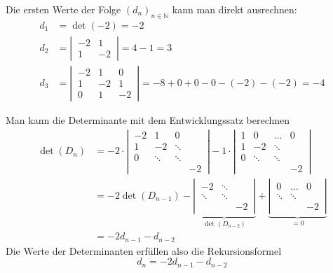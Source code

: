 \begin{loesung}
\begin{teilaufgaben}
\item
Die ersten Werte der Folge $(d_n)_{n\in\mathbb N}$ kann man direkt ausrechnen:
\begin{align*}
d_1&=\det(-2)=-2\\
d_2&=\left|\,
\begin{matrix}-2&1\\1&-2\end{matrix}
\,\right|=4-1=3
\\
d_3&=\left|\,
\begin{matrix}
-2& 1& 0\\
 1&-2& 1\\
 0& 1&-2
\end{matrix}
\,\right|=-8+0+0-0-(-2)-(-2)=-4
\end{align*}
\item
Man kann die Determinante mit dem Entwicklungssatz berechnen
\begin{align*}
\det(D_n)
&=
-2\cdot
\left|\,
\begin{matrix}
-2&     1&     0&  \\
 1&    -2&\ddots&  \\
 0&\ddots&\ddots&  \\
  &      &      &-2
\end{matrix}
\,\right|
-1\cdot
\left|\,
\begin{matrix}
 1&     0&\dots & 0\\
 1&    -2&\ddots&  \\
 0&\ddots&\ddots&  \\
  &      &      &-2
\end{matrix}
\,\right|
\\
&=
-2\det(D_{n-1})
-\underbrace{\left|\,
\begin{matrix}
    -2&\ddots&  \\
\ddots&\ddots&  \\
      &      &-2
\end{matrix}
\,\right|}_{\det(D_{n-2})}
+\underbrace{\left|\,
\begin{matrix}
     0&\dots & 0\\
\ddots&\ddots&  \\
      &      &-2
\end{matrix}
\,\right|}_{=0}
\\
&=-2d_{n-1}-d_{n-2}
\end{align*}
Die Werte der Determinanten erfüllen also die Rekursionsformel
\[
d_n=-2d_{n-1}-d_{n-2}
\]



\end{teilaufgaben}
\end{loesung}
